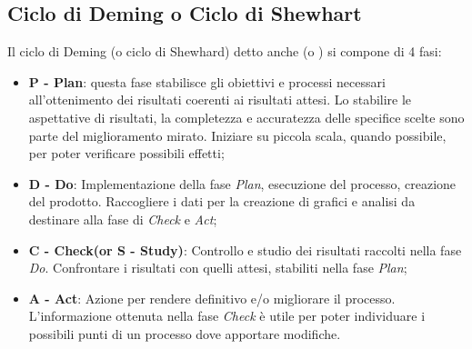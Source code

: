   \subsection{Ciclo di Deming o Ciclo di Shewhart}
  Il ciclo di Deming (o ciclo di Shewhard) detto anche  (o ) si compone di 4 fasi:
  \begin{itemize}
    \item \textbf{P - Plan}: questa fase stabilisce gli obiettivi e processi necessari all'ottenimento dei risultati coerenti ai risultati attesi.
    Lo stabilire le aspettative di risultati, la completezza e accuratezza delle specifice scelte sono parte del miglioramento mirato.
    Iniziare su piccola scala, quando possibile, per poter verificare possibili effetti;
    \item \textbf{D - Do}: Implementazione della fase \emph{Plan}, esecuzione del processo, creazione del prodotto.
    Raccogliere i dati per la creazione di grafici e analisi da destinare alla fase di \emph{Check} e \emph{Act};
    \item \textbf{C - Check(or S - Study)}: Controllo e studio dei risultati raccolti nella fase \emph{Do}. Confrontare i risultati con quelli attesi, stabiliti nella fase \emph{Plan};
    \item \textbf{A - Act}: Azione per rendere definitivo e/o migliorare il processo. L'informazione ottenuta nella fase \emph{Check} è utile per poter individuare i possibili punti di un processo dove apportare modifiche.
  \end{itemize}
